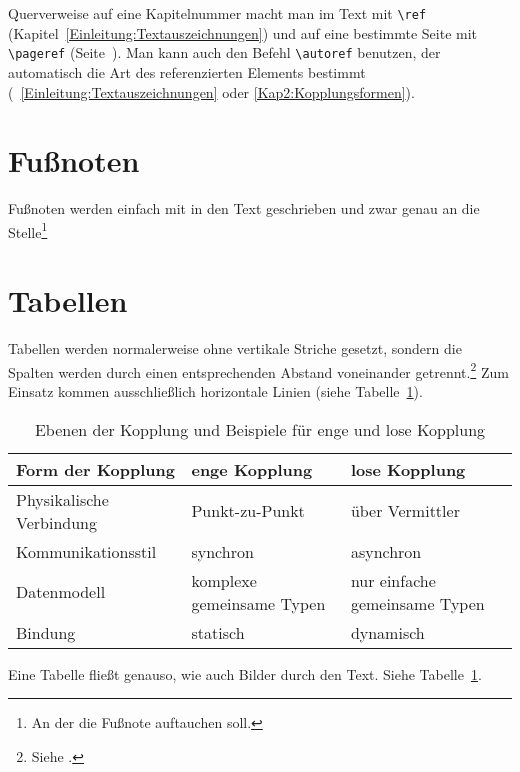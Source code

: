 Querverweise auf eine Kapitelnummer macht man im Text mit \verb+\ref+ (Kapitel~\ref{Einleitung:Textauszeichnungen}) und auf eine bestimmte Seite mit \verb+\pageref+ (Seite~\pageref{Einleitung:Textauszeichnungen}). Man kann auch den Befehl \verb+\autoref+ benutzen, der automatisch die Art des referenzierten Elements bestimmt (\zb \ \autoref{Einleitung:Textauszeichnungen} oder \autoref{Kap2:Kopplungsformen}).


\section{Fußnoten}

Fußnoten werden einfach mit in den Text geschrieben und zwar genau an die Stelle\footnote{An der die Fußnote auftauchen soll.}


\section{Tabellen}

Tabellen werden normalerweise ohne vertikale Striche gesetzt, sondern die Spalten werden durch einen entsprechenden Abstand voneinander getrennt.\footnote{Siehe \cite[S. 89]{Willberg1999}.} Zum Einsatz kommen ausschließlich horizontale Linien (siehe Tabelle~\ref{Kap2:Kopplungsformen}).

\begin{table}[h]
  \caption{Ebenen der Kopplung und Beispiele für enge und lose Kopplung}
  \label{Kap2:Kopplungsformen}
  \renewcommand{\arraystretch}{1.2}
  \centering
  \sffamily
  \begin{footnotesize}
    \begin{tabular}{l l l}
    \toprule
    \textbf{Form der Kopplung} & \textbf{enge Kopplung} & \textbf{lose Kopplung}\\
    \midrule
    Physikalische Verbindung	&	Punkt-zu-Punkt	& 	über Vermittler\\
    Kommunikationsstil	&	synchron		&	asynchron\\
    Datenmodell	&	komplexe gemeinsame Typen	&	nur einfache gemeinsame Typen\\
    Bindung	&	statisch		&	dynamisch\\
    \bottomrule
    \end{tabular}
  \end{footnotesize}
  \rmfamily
\end{table}

Eine Tabelle fließt genauso, wie auch Bilder durch den Text. Siehe Tabelle~\ref{Kap2:Kopplungsformen}.



